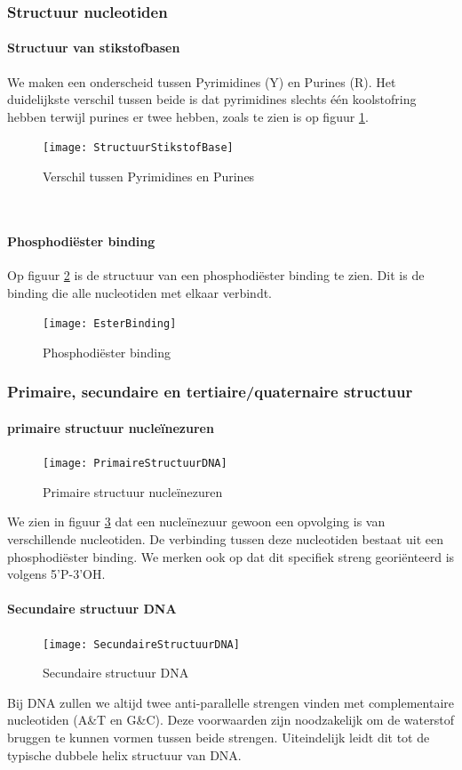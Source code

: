 \documentclass[a4paper,kul]{kulakarticle} %
\begin{document}
\subsubsection{Structuur nucleotiden}
\paragraph{Structuur van stikstofbasen}
We maken een onderscheid tussen Pyrimidines (Y) en Purines (R). Het duidelijkste verschil tussen beide is dat pyrimidines slechts één koolstofring hebben terwijl purines er twee hebben, zoals te zien is op figuur \ref{fig:structuurstikstofbase}.
\begin{figure}[h]
	\centering
	\texttt{[image: StructuurStikstofBase]}
	\caption[StructuurStikstofBase]{Verschil tussen Pyrimidines en Purines}
	\label{fig:structuurstikstofbase}
\end{figure}\\
\paragraph{Phosphodiëster binding}
Op figuur \ref{fig:esterbinding} is de structuur van een phosphodiëster binding te zien. Dit is de binding die alle nucleotiden met elkaar verbindt. 
\begin{figure}[h]
	\centering
	\texttt{[image: EsterBinding]}
	\caption[Ester binding]{Phosphodiëster binding}
	\label{fig:esterbinding}
\end{figure}
\subsubsection{Primaire, secundaire en tertiaire/quaternaire structuur}
\paragraph{primaire structuur nucleïnezuren}
\begin{figure}[h]
	\centering
	\texttt{[image: PrimaireStructuurDNA]}
	\caption[Primaire structuur DNA]{Primaire structuur nucleïnezuren}
	\label{fig:primairestructuurdna}
\end{figure}
\noindent
We zien in figuur \ref{fig:primairestructuurdna} dat een nucleïnezuur gewoon een opvolging is van verschillende nucleotiden. De verbinding tussen deze nucleotiden bestaat uit een phosphodiëster binding. We merken ook op dat dit specifiek streng georiënteerd is volgens 5'P-3'OH. 
\paragraph{Secundaire structuur DNA}
\begin{figure}[h]
	\centering
	\texttt{[image: SecundaireStructuurDNA]}
	\caption[Secundaire structuur DNA]{Secundaire structuur DNA}
	\label{fig:secundairestructuurdna}
\end{figure}
\noindent
Bij DNA zullen we altijd twee anti-parallelle strengen vinden met complementaire nucleotiden (A\&T en G\&C). Deze voorwaarden zijn noodzakelijk om de waterstof bruggen te kunnen vormen tussen beide strengen. Uiteindelijk leidt dit tot de typische dubbele helix structuur van DNA. 
\end{document}
